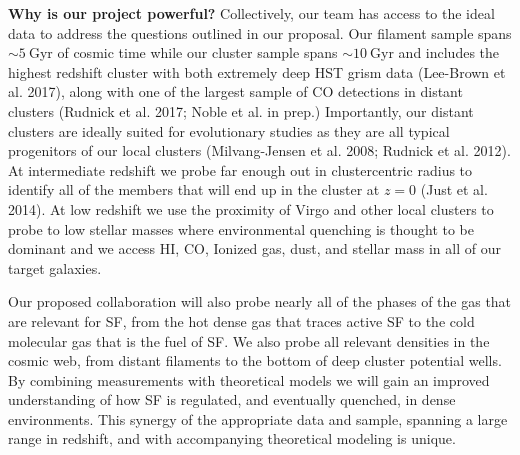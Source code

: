 \documentclass[11pt]{article}
\begin{document}
\textbf{Why is our project powerful?}   Collectively, our team has
access to the ideal data to address the questions outlined in our
proposal.  Our filament sample spans $\sim 5~$Gyr of cosmic time while our cluster sample spans $\sim10~$Gyr and
includes the highest redshift cluster with both extremely deep HST
grism data (Lee-Brown et al. 2017), along with one of the largest sample of CO detections in distant clusters (Rudnick et al. 2017; Noble et al. in prep.)  Importantly, our distant clusters are ideally
suited for evolutionary studies as they are all typical progenitors of
our local clusters (Milvang-Jensen et al. 2008; Rudnick et al. 2012).
At intermediate redshift we probe far enough out in clustercentric
radius to identify all of the members that will end up in the cluster
at $z=0$ (Just et al. 2014).  At low redshift we use the proximity of Virgo and other local clusters to probe to low stellar masses where environmental quenching is thought to be dominant and we access HI, CO, Ionized gas, dust, and stellar mass in all of our target galaxies. 

Our proposed collaboration will also probe nearly all of the phases of
the gas that are relevant for SF, from the hot dense gas
that traces active SF to the cold molecular gas that is
the fuel of SF.  We also probe all relevant densities in the cosmic web, from distant filaments to the bottom of deep cluster potential wells.  By combining  measurements with
theoretical models we will gain an improved understanding of
how SF is regulated, and eventually quenched, in dense
environments.  This synergy of the appropriate data and sample, spanning a large range in redshift, and with
accompanying theoretical modeling is unique.


\end{document}
